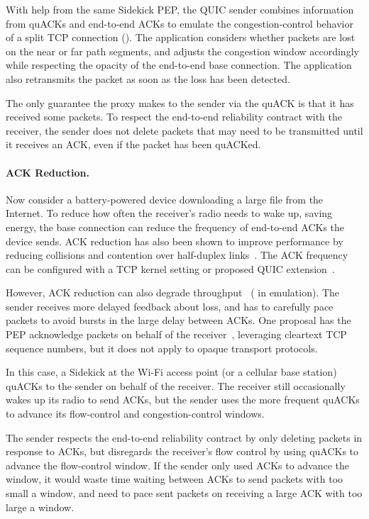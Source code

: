 With help from the same Sidekick PEP, the QUIC sender combines information from
quACKs and end-to-end ACKs to emulate the congestion-control behavior of a
split TCP connection (). The
application considers whether packets are lost on the near or far path
segments, and adjusts the congestion window accordingly while respecting the
opacity of the end-to-end base connection. The application also retransmits the
packet as soon as the loss has been detected.

The only guarantee the proxy makes to the sender via the quACK is that it has
received some packets. To respect the end-to-end reliability contract with the
receiver, the sender does not delete packets that may need to be transmitted
until it receives an ACK, even if the packet has been quACKed.

\paragraph{ACK Reduction.}

Now consider a battery-powered device downloading a large file from the
Internet. To reduce how often the receiver's
radio needs to wake up, saving energy, the base connection can reduce the
frequency of end-to-end ACKs the device sends.
ACK reduction has also been shown to improve performance by reducing collisions
and contention over half-duplex links~\cite{custura2023reducing,li2020tack}.
The ACK frequency can be configured with a TCP kernel setting or proposed
QUIC extension~\cite{ietf-quic-ack-frequency-07}.

However, ACK reduction can also degrade throughput~\cite{custura2023reducing,custura2020impact}
( in emulation).
The sender receives more delayed feedback about loss, and has to carefully
pace packets to avoid bursts in the large delay between ACKs.
One proposal has the PEP acknowledge packets on behalf of the
receiver~\cite{kliazovich2012arqproxy}, leveraging cleartext TCP sequence
numbers, but it does not apply to opaque transport protocols.

In this case, a Sidekick at the Wi-Fi access point (or a cellular base station)
quACKs to the sender on behalf of the receiver. The receiver still occasionally
wakes up its radio to send ACKs, but the sender uses the more frequent quACKs
to advance its flow-control and congestion-control windows.

The sender respects the end-to-end reliability contract by only deleting packets
in response to ACKs, but disregards the receiver's flow control by using quACKs
to advance the flow-control window. If the sender only used ACKs to advance the
window, it would waste time waiting between ACKs to send packets with too small
a window, and need to pace sent packets on receiving a large ACK with too large
a window.

